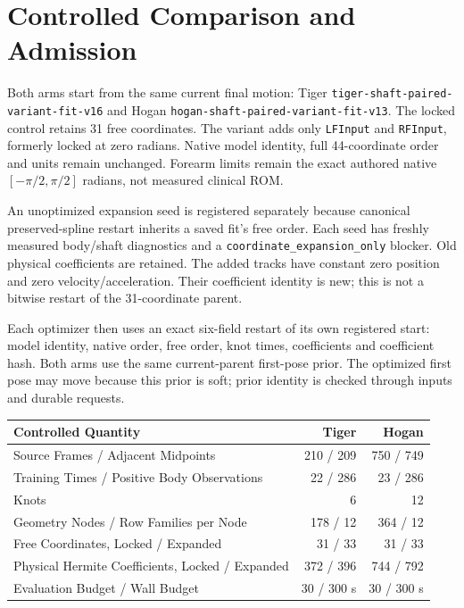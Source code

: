 \documentclass[11pt,letterpaper]{article}
\newcommand{\code}[1]{\nolinkurl{#1}}\newcommand{\hash}[1]{{\footnotesize\nolinkurl{#1}}}
\begin{document}
\section{Controlled Comparison and Admission}
Both arms start from the same current final motion: Tiger
\code{tiger-shaft-paired-variant-fit-v16} and Hogan \code{hogan-shaft-paired-variant-fit-v13}.
The locked control retains 31 free coordinates. The variant adds only \code{LFInput} and
\code{RFInput}, formerly locked at zero radians. Native model identity, full 44-coordinate
order and units remain unchanged. Forearm limits remain the exact authored native
$[-\pi/2,\pi/2]$ radians, not measured clinical ROM.

An unoptimized expansion seed is registered separately because canonical preserved-spline
restart inherits a saved fit's free order. Each seed has freshly measured body/shaft diagnostics
and a \code{coordinate_expansion_only} blocker. Old physical coefficients are retained.
The added tracks have constant zero position and zero velocity/acceleration.
Their coefficient identity is new; this is not a bitwise restart of the 31-coordinate parent.

Each optimizer then uses an exact six-field restart of its own registered start:
model identity, native order, free order, knot times, coefficients and coefficient hash.
Both arms use the same current-parent first-pose prior. The optimized first pose may move
because this prior is soft; prior identity is checked through inputs and durable requests.
\par\smallskip
\begin{tabular}{@{}p{.62\linewidth}rr@{}}\toprule
Controlled Quantity & Tiger & Hogan\\\midrule
Source Frames / Adjacent Midpoints & 210 / 209 & 750 / 749\\
Training Times / Positive Body Observations & 22 / 286 & 23 / 286\\
Knots & 6 & 12\\
Geometry Nodes / Row Families per Node & 178 / 12 & 364 / 12\\
Free Coordinates, Locked / Expanded & 31 / 33 & 31 / 33\\
Physical Hermite Coefficients, Locked / Expanded & 372 / 396 & 744 / 792\\
Evaluation Budget / Wall Budget & 30 / 300 s & 30 / 300 s\\\bottomrule
\end{tabular}\par\smallskip
\end{document}

